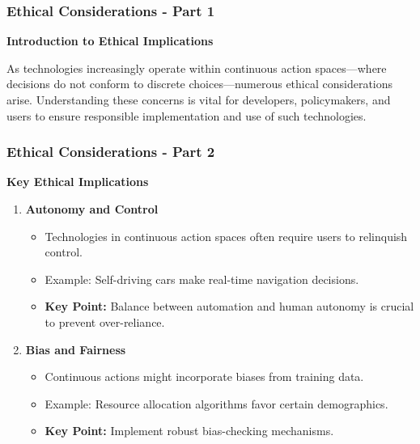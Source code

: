 \documentclass[aspectratio=169]{beamer}
\begin{document}
\begin{frame}[fragile]
    \frametitle{Ethical Considerations - Part 1}
    \textbf{Introduction to Ethical Implications}
    
    As technologies increasingly operate within continuous action spaces—where decisions do not conform to discrete choices—numerous ethical considerations arise. Understanding these concerns is vital for developers, policymakers, and users to ensure responsible implementation and use of such technologies.
\end{frame}

\begin{frame}[fragile]
    \frametitle{Ethical Considerations - Part 2}
    \textbf{Key Ethical Implications}
    
    \begin{enumerate}
        \item \textbf{Autonomy and Control}
        \begin{itemize}
            \item Technologies in continuous action spaces often require users to relinquish control. 
            \item Example: Self-driving cars make real-time navigation decisions.
            \item \textbf{Key Point:} Balance between automation and human autonomy is crucial to prevent over-reliance.
        \end{itemize}
        
        \item \textbf{Bias and Fairness}
        \begin{itemize}
            \item Continuous actions might incorporate biases from training data.
            \item Example: Resource allocation algorithms favor certain demographics.
            \item \textbf{Key Point:} Implement robust bias-checking mechanisms.
        \end{itemize}
    \end{enumerate}
\end{frame}
\end{document}
